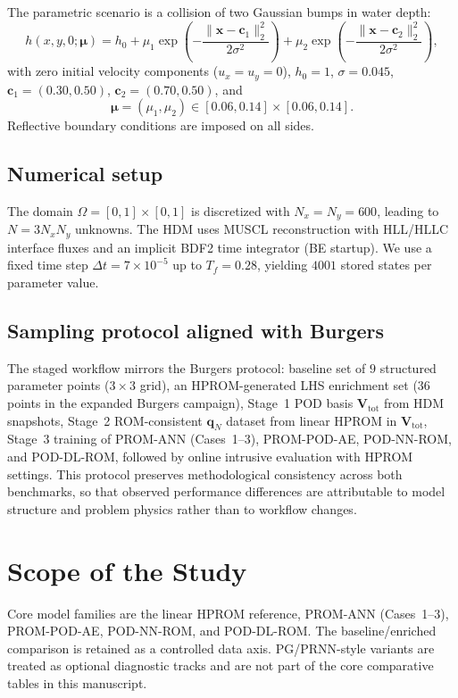 \documentclass[11pt]{article}
\begin{document}
The parametric scenario is a collision of two Gaussian bumps in water depth:
\begin{equation}
h(x,y,0;\bm\mu)=h_0
+\mu_1\exp\!\left(-\frac{\|\mathbf x-\mathbf c_1\|_2^2}{2\sigma^2}\right)
+\mu_2\exp\!\left(-\frac{\|\mathbf x-\mathbf c_2\|_2^2}{2\sigma^2}\right),
\end{equation}
with zero initial velocity components ($u_x=u_y=0$), $h_0=1$, $\sigma=0.045$,
$\mathbf c_1=(0.30,0.50)$, $\mathbf c_2=(0.70,0.50)$, and
\begin{equation}
\bm\mu=(\mu_1,\mu_2)\in[0.06,0.14]\times[0.06,0.14].
\end{equation}
Reflective boundary conditions are imposed on all sides.

\subsection{Numerical setup}
The domain $\Omega=[0,1]\times[0,1]$ is discretized with $N_x=N_y=600$,
leading to $N=3N_xN_y$ unknowns. The HDM uses MUSCL reconstruction with
HLL/HLLC interface fluxes and an implicit BDF2 time integrator (BE startup).
We use a fixed time step $\Delta t=7\times10^{-5}$ up to $T_f=0.28$, yielding
$4001$ stored states per parameter value.

\subsection{Sampling protocol aligned with Burgers}
The staged workflow mirrors the Burgers protocol: baseline set of $9$ structured
parameter points ($3\times3$ grid), an HPROM-generated LHS enrichment set
($36$ points in the expanded Burgers campaign), Stage~1 POD basis $\mathbf V_{\mathrm{tot}}$ from HDM snapshots, Stage~2
ROM-consistent $\mathbf q_N$ dataset from linear HPROM in
$\mathbf V_{\mathrm{tot}}$, Stage~3 training of PROM-ANN (Cases~1--3),
PROM-POD-AE, POD-NN-ROM, and POD-DL-ROM, followed by online intrusive
evaluation with HPROM settings. This protocol preserves methodological
consistency across both benchmarks, so
that observed performance differences are attributable to model structure and
problem physics rather than to workflow changes.

\section{Scope of the Study}
Core model families are the linear HPROM reference, PROM-ANN (Cases~1--3),
PROM-POD-AE, POD-NN-ROM, and POD-DL-ROM. The baseline/enriched comparison is
retained as a controlled data axis. PG/PRNN-style variants are treated as
optional diagnostic tracks and are not part of the core comparative tables in
this manuscript.
\end{document}
